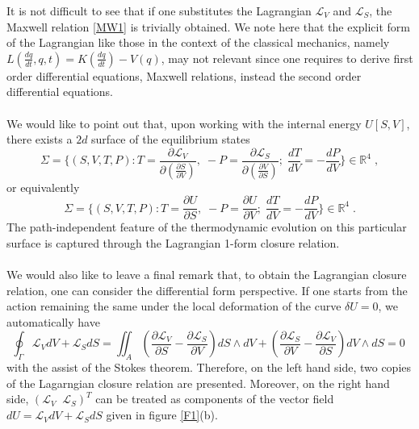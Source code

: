 \documentclass[12pt]{article}
\numberwithin{equation}{section}
\theoremstyle{remark}
\theoremstyle{definition}
\newcommand{\nn}{\nonumber}
\begin{document}
It is not difficult to see that if one substitutes the Lagrangian $\mathcal{L}_V$ and $\mathcal{L}_S$, the Maxwell relation \eqref{MW1} is trivially obtained. We note here that the explicit form of the Lagrangian like those in the context of the classical mechanics, namely $L\left( \frac{dq}{dt},q,t\right)=K\left(\frac{dq}{dt}\right)-V(q)$, may not relevant since one requires to derive first order differential equations, Maxwell relations, instead the second order differential equations.
\\
\\
We would like to point out that, upon working with the internal energy $U[S,V]$, there exists a $2d$ surface of the equilibrium states
\begin{equation}
    \Sigma=\Big\{(S,V,T,P): T=\frac{\partial \mathcal{L}_V}{\partial \left(\frac{\partial S}{\partial V}\right)}, \;-P=\frac{\partial \mathcal{L}_S}{\partial \left(\frac{\partial V}{\partial S}\right)};\; \frac{dT}{dV}=-\frac{dP}{dV}\Big\} \in \mathbb{R}^4\;,\nn
\end{equation}
or equivalently
\begin{equation}
    \Sigma=\Big\{(S,V,T,P): T=\frac{\partial U}{\partial S},\; -P=\frac{\partial U}{\partial V};\; \frac{dT}{dV}=-\frac{dP}{dV}\Big\} \in \mathbb{R}^4\;.\nn
\end{equation}
The path-independent feature of the thermodynamic evolution on this particular surface is captured through the Lagrangian 1-form closure relation.
\\
\\
We would also like to leave a final remark that, to obtain the Lagrangian closure relation, one can consider the differential form perspective. If one starts from the action remaining the same under the local deformation of the curve $\delta U=0$, we automatically have
\begin{equation}
    \oint_\Gamma \mathcal{L}_VdV+\mathcal{L}_SdS=\iint_A\left(\frac{\partial \mathcal{L}_V}{\partial S}-\frac{\partial \mathcal{L}_S}{\partial V}\right)dS\wedge dV+\left(\frac{\partial \mathcal{L}_S}{\partial V}-\frac{\partial \mathcal{L}_V}{\partial S}\right)dV\wedge dS=0\;
\end{equation}
with the assist of the Stokes theorem. Therefore, on the left hand side, two copies of the Lagarngian closure relation are presented. Moreover, on the right hand side, $(\mathcal{L}_V\;\;\mathcal{L}_S)^T$ can be treated as components of the vector field $dU=\mathcal L_VdV+\mathcal L_SdS$ given in figure \ref{F1}(b).
\end{document}

